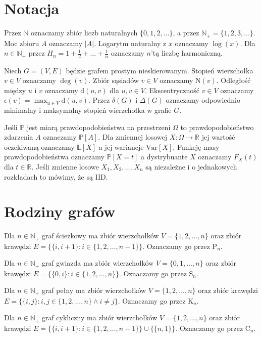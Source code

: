 \section{Notacja}

Przez $\mathbb{N}$ oznaczamy zbiór liczb naturalnych $\{0,1,2,\dots\}$, a przez $\mathbb{N}_+ = \{1,2,3,\dots\}$.  Moc zbioru $A$ oznaczamy $|A|$. Logarytm naturalny z $x$ oznaczamy $\log(x)$. 
Dla $n\in\mathbb{N}_+$ przez $H_n=1+\frac{1}{2}+\dots+\frac{1}{n}$ oznaczamy $n$'tą liczbę harmoniczną.

Niech $G=(V,E)$ będzie grafem prostym nieskierowanym. Stopień wierzchołka $v \in V$ oznaczamy $\deg(v)$. Zbiór sąsiadów $v\in V$ oznaczamy $\mathrm{N}(v)$. Odległość między $u$ i $v$ oznaczamy $\mathrm{d}(u,v)$ dla $u,v\in V$. Ekscentryczność $v\in V$ oznaczamy $\epsilon(v) = \max_{u\in V} \mathrm{d}(u,v)$. Przez $\delta(G)$ i $\Delta(G)$ oznaczamy odpowiednio minimalny i maksymalny stopień wierzchołka w grafie $G$.

Jeśli $\mathbb{P}$ jest miarą prawdopodobieństwa na przestrzeni $\Omega$ to prawdopodobieństwo zdarzenia $A$ oznaczamy $\mathbb{P}[A]$. Dla zmiennej losowej $X:\Omega\to\mathbb{R}$ jej wartość oczekiwaną oznaczamy $\mathbb{E}[X]$ a jej wariancje $\mathrm{Var}[X]$. Funkcję masy prawdopodobieństwa oznaczamy $\mathbb{P}[X=t]$ a dystrybuante $X$ oznaczamy $F_X(t)$ dla $t\in\mathbb{R}$. Jeśli zmienne losowe $X_1,X_2,\dots, X_n$ są niezależne i o jednakowych rozkładach to mówimy, że są IID.


\section{Rodziny grafów}

Dla $n \in \mathbb{N}_+$ graf ścieżkowy ma zbiór wierzchołków $V = \{1, 2, \dots, n\}$ oraz zbiór krawędzi $E = \{\{i, i+1\} : i \in \{1, 2, \dots, n-1\}\}$. Oznaczamy go przez $\mathrm{P}_n$.

Dla $n \in \mathbb{N}_+$ graf gwiazda ma zbiór wierzchołków $V = \{0, 1, \dots, n\}$ oraz zbiór krawędzi $E = \{\{0, i\} : i \in \{1, 2, \dots, n\}\}$. Oznaczamy go przez $\mathrm{S}_n$.

Dla $n \in \mathbb{N}_+$ graf pełny ma zbiór wierzchołków $V = \{1, 2, \dots, n\}$ oraz zbiór krawędzi $E = \{\{i, j\} : i, j \in \{1, 2, \dots, n\} \land i \ne j\}$. Oznaczamy go przez $\mathrm{K}_n$.

Dla $n \in \mathbb{N}_+$ graf cykliczny ma zbiór wierzchołków $V = \{1, 2, \dots, n\}$ oraz zbiór krawędzi 
$E = \{\{i, i+1\} : i \in \{1, 2, \dots, n-1\}\} \cup \{\{n, 1\}\}$. Oznaczamy go przez $\mathrm{C}_n$.



